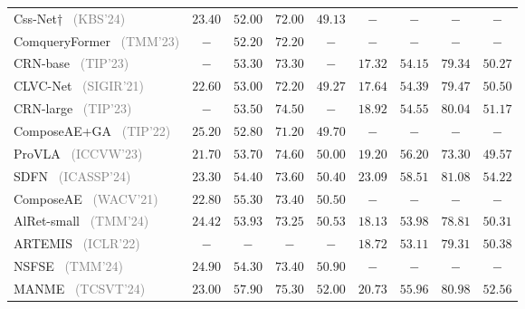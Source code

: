 \begin{table*}
\begin{tabular}{l|ccc|c|ccc|c}
    Css-Net†~\cite{zhang2024cssnet} \footnotesize{\textcolor{gray}{(KBS'24)}} & $23.40$ & $52.00$ & $72.00$ &$49.13$ &$-$ &$-$ & $-$&$-$\\
    ComqueryFormer~\cite{xu2023ComqueryFormer} \footnotesize{\textcolor{gray}{(TMM'23)}} & $-$ & $52.20$ & $72.20$ &$-$ &$-$ &$-$ & $-$&$-$\\
    CRN-base~\cite{yang2023crn} \footnotesize{\textcolor{gray}{(TIP'23)}} & $-$ & $53.30$ & $73.30$ &$-$ & $17.32$ & $54.15$ & $79.34$ & $50.27$ \\
    CLVC-Net~\cite{wen2021clvcnet} \footnotesize{\textcolor{gray}{(SIGIR'21)}} & $22.60$ & $53.00$ & $72.20$ &$49.27$ & $17.64$ & $54.39$ & $79.47$ & $50.50$ \\
    CRN-large~\cite{yang2023crn} \footnotesize{\textcolor{gray}{(TIP'23)}} & $-$ & $53.50$ & $74.50$ &$-$ & $18.92$ & $54.55$ & $80.04$ & $51.17$ \\
    ComposeAE+GA~\cite{huang2022ga} \footnotesize{\textcolor{gray}{(TIP'22)}} & $25.20$ & $52.80$ & $71.20$ &$49.70$ &$-$ &$-$ & $-$&$-$\\
    ProVLA~\cite{hu2023provla} \footnotesize{\textcolor{gray}{(ICCVW'23)}} & $21.70$ & $53.70$ & $74.60$ &$50.00$ & $19.20$ & $56.20$ & $73.30$ & $49.57$ \\
    SDFN~\cite{wu2024sdfn} \footnotesize{\textcolor{gray}{(ICASSP'24)}} & $23.30$ & $54.40$ & $73.60$ &$50.40$ & $23.09$ & $58.51$ & $81.08$ & $54.22$ \\
    ComposeAE~\cite{anwaar2021ComposeAE} \footnotesize{\textcolor{gray}{(WACV'21)}} & $22.80$ & $55.30$ & $73.40$ &$50.50$ &$-$ &$-$ & $-$&$-$\\
    AlRet-small~\cite{xu2024alret} \footnotesize{\textcolor{gray}{(TMM'24)}} & $24.42$ & $53.93$ & $73.25$ &$50.53$ & $18.13$ & $53.98$ & $78.81$ & $50.31$ \\
    ARTEMIS~\cite{delmas2022artemis} \footnotesize{\textcolor{gray}{(ICLR'22)}} &$-$ &$-$ & $-$&$-$& $18.72$ & $53.11$ & $79.31$ & $50.38$ \\
    NSFSE~\cite{wang2024NSFSE} \footnotesize{\textcolor{gray}{(TMM'24)}} & $24.90$ & $54.30$ & $73.40$ &$50.90$ &$-$ &$-$ & $-$&$-$\\
    MANME~\cite{li2023manme} \footnotesize{\textcolor{gray}{(TCSVT'24)}} & $23.00$ & $57.90$ & $75.30$ &$52.00$ & $20.73$ & $55.96$ & $80.98$ & $52.56$ \\

\end{tabular}
\end{table*}
